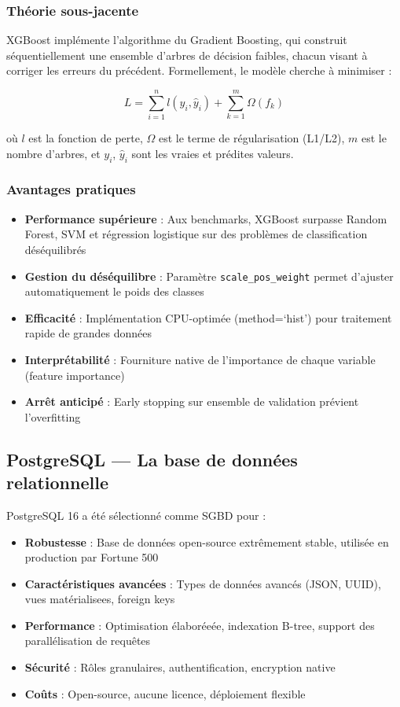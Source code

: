 \documentclass[a4paper,12pt,twoside]{report}
\begin{document}
\subsubsection{Théorie sous-jacente}

XGBoost implémente l'algorithme du Gradient Boosting, qui construit séquentiellement une ensemble d'arbres de décision faibles, chacun visant à corriger les erreurs du précédent. Formellement, le modèle cherche à minimiser :

$$L = \sum_{i=1}^{n} l(y_i, \hat{y}_i) + \sum_{k=1}^{m} \Omega(f_k)$$

où $l$ est la fonction de perte, $\Omega$ est le terme de régularisation (L1/L2), $m$ est le nombre d'arbres, et $y_i$, $\hat{y}_i$ sont les vraies et prédites valeurs.

\subsubsection{Avantages pratiques}

\begin{itemize}
    \item \textbf{Performance supérieure} : Aux benchmarks, XGBoost surpasse Random Forest, SVM et régression logistique sur des problèmes de classification déséquilibrés
    \item \textbf{Gestion du déséquilibre} : Paramètre \texttt{scale\_pos\_weight} permet d'ajuster automatiquement le poids des classes
    \item \textbf{Efficacité} : Implémentation CPU-optimée (method=`hist') pour traitement rapide de grandes données
    \item \textbf{Interprétabilité} : Fourniture native de l'importance de chaque variable (feature importance)
    \item \textbf{Arrêt anticipé} : Early stopping sur ensemble de validation prévient l'overfitting
\end{itemize}

\subsection{PostgreSQL — La base de données relationnelle}

PostgreSQL 16 a été sélectionné comme SGBD pour :

\begin{itemize}
    \item \textbf{Robustesse} : Base de données open-source extrêmement stable, utilisée en production par Fortune 500
    \item \textbf{Caractéristiques avancées} : Types de données avancés (JSON, UUID), vues matérialisees, foreign keys
    \item \textbf{Performance} : Optimisation élaboréeée, indexation B-tree, support des parallélisation de requêtes
    \item \textbf{Sécurité} : Rôles granulaires, authentification, encryption native
    \item \textbf{Coûts} : Open-source, aucune licence, déploiement flexible
\end{itemize}
\end{document}
